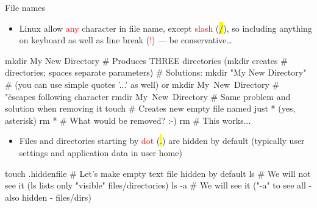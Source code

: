 \documentclass[compress, ucs, xelatex, 11pt, xcolor=svgnames,
  hyperref={
    bookmarks=true,
    unicode=true,
    colorlinks=true,
    pdftitle={Linux, command line and MetaCentrum},
    plainpages=false,
    pdfauthor={Vojtech Zeisek},
    pdfsubject={Course about use of Linux command line, writing shell scripts and using MetaCentrum of CESNET},
    pdfcreator={XeLaTeX},
    pdfkeywords={Linux, GNU, BASH, shell, command line, MetaCentrum},
    linkcolor=DarkRed,
    anchorcolor=DarkBlue,
    citecolor=Indigo,
    filecolor=NavyBlue,
    menucolor=DarkMagenta,
    urlcolor=DarkBlue,
    pdftex},
  url={hyphens, lowtilde} %
  ]{beamer}
\renewcommand{\texttt}[1]{\hl{\ttfamily #1}}
\renewcommand{\alert}[1]{\textcolor{red}{#1}}
\begin{document}
\begin{frame}[fragile]{File names}
  \begin{itemize}
    \item Linux allow \alert{any} character in file name, except \alert{slash} (\texttt{/}), so including anything on keyboard as well as line break (\alert{!}) --- be conservative\ldots
  \end{itemize}
  \begin{bashcode}
    mkdir My New Directory # Produces THREE directories (mkdir creates
                           # directories; spaces separate parameters)
                           # Solutions:
    mkdir "My New Directory" # (you can use simple quotes '...' as well) or
    mkdir My\ New\ Directory # "\" escapes following character
    rmdir My\ New\ Directory # Same problem and solution when removing it
    touch \* # Creates new empty file named just * (yes, asterisk)
    rm * # What would be removed? :-)
    rm \* # This works...
  \end{bashcode}
  \begin{itemize}
    \item Files and directories starting by \alert{dot} (\texttt{.}) are hidden by default (typically user settings and application data in user home)
  \end{itemize}
  \begin{bashcode}
    touch .hiddenfile # Let's make empty text file hidden by default
    ls # We will not see it (ls lists only "visible" files/directories)
    ls -a # We will see it ("-a" to see all - also hidden - files/dirs)
  \end{bashcode}
\end{frame}
\end{document}

